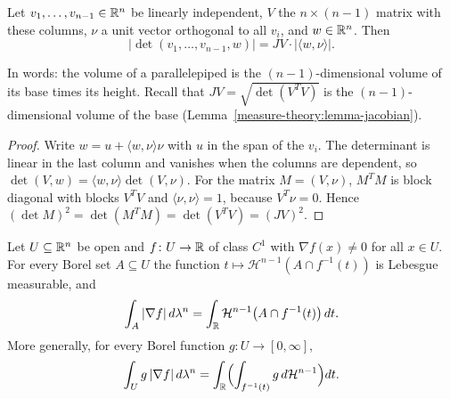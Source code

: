 \begin{lemma}\label{measure-theory:lemma-normal-determinant}
Let $v_1, \ldots, v_{n-1} \in \mathbb{R}^n$ be linearly independent, $V$ the $n \times (n - 1)$ matrix with these columns, $\nu$ a unit vector orthogonal to all $v_i$, and $w \in \mathbb{R}^n$. Then
\[
|\det(v_1, \ldots, v_{n-1}, w)| = JV \cdot |\langle w, \nu\rangle| .
\]
\end{lemma}

In words: the volume of a parallelepiped is the $(n-1)$-dimensional volume of its base times its height. Recall that $JV = \sqrt{\det(V^TV)}$ is the $(n-1)$-dimensional volume of the
base (Lemma~\ref{measure-theory:lemma-jacobian}).

\begin{proof}
Write $w = u + \langle w, \nu\rangle\nu$ with $u$ in the span of the $v_i$. The determinant is linear in the last column and vanishes when the columns are dependent, so
$\det(V, w) = \langle w, \nu\rangle\det(V, \nu)$. For the matrix $M = (V, \nu)$, $M^TM$ is block diagonal with blocks $V^TV$ and $\langle\nu, \nu\rangle = 1$, because $V^T\nu = 0$. Hence
$(\det M)^2 = \det(M^TM) = \det(V^TV) = (JV)^2$.
\end{proof}

\begin{theorem}\label{measure-theory:theorem-coarea}
Let $U \subseteq \mathbb{R}^n$ be open and $f \colon U \to \mathbb{R}$ of class $C^1$ with $\nabla f(x) \neq 0$ for all $x \in U$. For every Borel set $A \subseteq U$ the function
$t \mapsto \mathcal{H}^{n-1}(A \cap f^{-1}(t))$ is Lebesgue measurable, and
\[
\int_A|\nabla f|\,d\lambda^n = \int_{\mathbb{R}}\mathcal{H}^{n-1}\bigl(A \cap f^{-1}(t)\bigr)\,dt .
\]
More generally, for every Borel function $g \colon U \to [0, \infty]$,
\begin{equation}\label{measure-theory:equation-coarea}
\int_Ug\,|\nabla f|\,d\lambda^n = \int_{\mathbb{R}}\Bigl(\int_{f^{-1}(t)}g\,d\mathcal{H}^{n-1}\Bigr)dt .
\end{equation}
\end{theorem}


